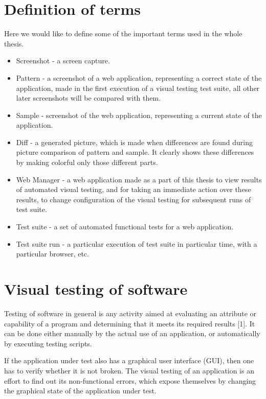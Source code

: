 \documentclass[11pt,oneside,final]{fithesis2}
\begin{document}
\chapter{Definition of terms}
Here we would like to define some of the important terms used in the whole thesis.

\begin{itemize}
 \item Screenshot - a screen capture.
 \item Pattern - a screenshot of a web application, representing a correct state of the application, made in the first execution of 
 a visual testing test suite, all other later screenshots will be compared with them.
 \item Sample - screenshot of the web application, representing a current state of the application.
 \item Diff - a generated picture, which is made when differences are found during picture comparison of pattern and sample. It clearly
 shows these differences by making colorful only those different parts.
 \item Web Manager - a web application made as a part of this thesis to view results of automated visual testing, and for taking an immediate
 action over these results, to change configuration of the visual testing for subsequent runs of test suite.
 \item Test suite - a set of automated functional tests for a web application.
 \item Test suite run - a particular execution of test suite in particular time, with a particular browser, etc.
\end{itemize}


\chapter{Visual testing of software}    
    Testing of software in general is any activity aimed at evaluating an attribute or capability of a program and determining that it meets its required results [1]. 
    It can be done either manually by the actual use of an application, or automatically by executing testing scripts.
    
    If the application under test also has a graphical user interface (GUI), then one has to verify whether it is not broken. 
    The visual testing of an application is an effort to find out its non-functional errors, which expose themselves by changing the graphical state of the application under test.
    
\end{document}
